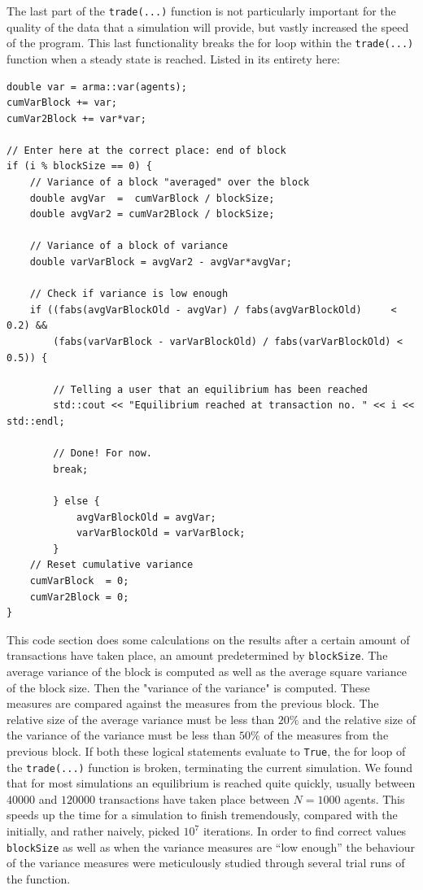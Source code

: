 \documentclass[10pt, a4paper]{amsart}
\begin{document}
The last part of the \lstinline|trade(...)| function is not particularly important for the quality of the data that a simulation will provide, but vastly increased the speed of the program. This last functionality breaks the for loop within the \lstinline|trade(...)| function when a steady state is reached. Listed in its entirety here:
\begin{lstlisting}
double var = arma::var(agents);
cumVarBlock += var;
cumVar2Block += var*var;

// Enter here at the correct place: end of block
if (i % blockSize == 0) {
	// Variance of a block "averaged" over the block
	double avgVar  =  cumVarBlock / blockSize;
	double avgVar2 = cumVar2Block / blockSize;

	// Variance of a block of variance
	double varVarBlock = avgVar2 - avgVar*avgVar;

	// Check if variance is low enough
	if ((fabs(avgVarBlockOld - avgVar) / fabs(avgVarBlockOld)     < 0.2) &&
		(fabs(varVarBlock - varVarBlockOld) / fabs(varVarBlockOld) < 0.5)) {

		// Telling a user that an equilibrium has been reached
		std::cout << "Equilibrium reached at transaction no. " << i << std::endl;

		// Done! For now.
		break;

		} else {
			avgVarBlockOld = avgVar;
			varVarBlockOld = varVarBlock;
		}
	// Reset cumulative variance
	cumVarBlock  = 0;
	cumVar2Block = 0;
}
\end{lstlisting}
This code section does some calculations on the results after a certain amount of transactions have taken place, an amount predetermined by \lstinline|blockSize|. The average variance of the block is computed as well as the average square variance of the block size. Then the "variance of the variance" is computed. These measures are compared against the measures from the previous block. The relative size of the average variance must be less than $20\%$ and the relative size of the variance of the variance must be less than $50\%$ of the measures from the previous block. If both these logical statements evaluate to \lstinline|True|, the for loop of the \lstinline|trade(...)| function is broken, terminating the current simulation. We found that for most simulations an equilibrium is reached quite quickly, usually between $40000$ and $120000$ transactions have taken place between $N=1000$ agents. This speeds up the time for a simulation to finish tremendously, compared with the initially, and rather naively, picked $10^7$ iterations. In order to find correct values \lstinline|blockSize| as well as when the variance measures are ``low enough'' the behaviour of the variance measures were meticulously studied through several trial runs of the function.
\end{document}

